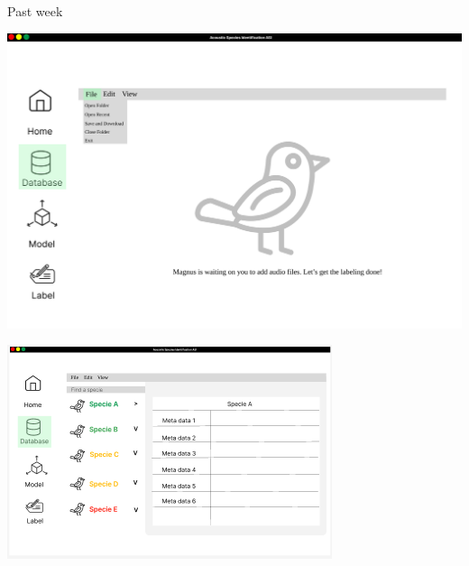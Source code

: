 \begin{frame}{Past week} 
    \begin{minipage}[b]{0.45\textwidth}
        \centering
        \includegraphics[width=\textwidth]{images/sampleui2.png}  
    \end{minipage}
    \hspace{0.05\textwidth}
    \begin{minipage}[b]{0.45\textwidth}
        \centering
        \includegraphics[width=\textwidth]{images/sampleui5.png} 
    \end{minipage}
\end{frame}

